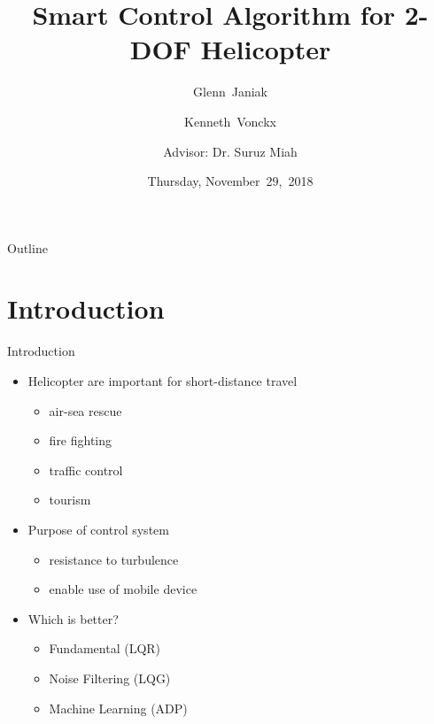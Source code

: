 \documentclass{beamer}
\title[2-DOF Helicopter (Proposal)]{Smart Control Algorithm for 2-DOF Helicopter}
\author[G.~Janiak, K.~Vonckx]{Glenn~Janiak \and Kenneth~Vonckx \and
Advisor: Dr. Suruz Miah}
\institute[Bradley University] %
{
  Department of Electrical and Computer Engineering\\
  Bradley University\\
  1501 W. Bradley Avenue\\
  Peoria, IL, 61625, USA
}
\date[November~29,~2018]{Thursday, November~29,~2018}
\begin{document}
\begin{frame}
  \titlepage
\end{frame}

\begin{frame}{Outline} %
  \tableofcontents%
\end{frame}

\section{Introduction}

\begin{frame}{Introduction}{} %
    \begin{itemize}
        \item Helicopter are important for short-distance travel
            \begin{itemize}
                \item air-sea rescue
                \item fire fighting
                \item traffic control
                \item tourism
            \end{itemize}
        \item Purpose of control system
            \begin{itemize}
                \item resistance to turbulence
                \item enable use of mobile device
            \end{itemize}
        \item Which is better?
            \begin{itemize}
                \item Fundamental (LQR)
                \item Noise Filtering (LQG) 
                \item Machine Learning (ADP)
            \end{itemize}
    \end{itemize}
\end{frame}
\end{document}
